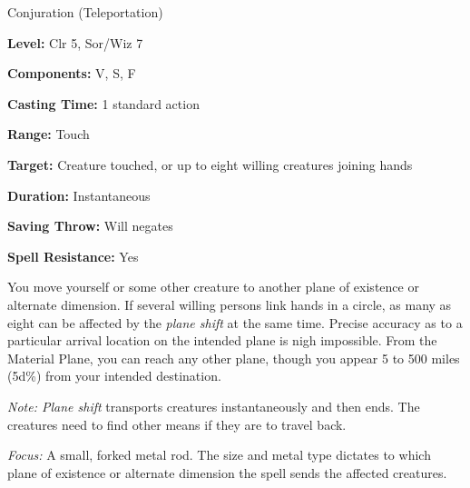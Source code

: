 
Conjuration (Teleportation)

\textbf{Level:} Clr 5, Sor/Wiz 7

\textbf{Components:} V, S, F

\textbf{Casting Time:} 1 standard action

\textbf{Range:} Touch

\textbf{Target:} Creature touched, or up to eight willing creatures joining hands

\textbf{Duration:} Instantaneous

\textbf{Saving Throw:} Will negates

\textbf{Spell Resistance:} Yes

You move yourself or some other creature to another plane of existence or alternate 
dimension. If several willing persons link hands in a circle, as many as eight 
can be affected by the \textit{plane shift} at the same time. Precise accuracy 
as to a particular arrival location on the intended plane is nigh impossible. From 
the Material Plane, you can reach any other plane, though you appear 5 to 500 miles 
(5d\%) from your intended destination.

\textit{Note: Plane shift} transports creatures instantaneously and then ends. 
The creatures need to find other means if they are to travel back.

\textit{Focus:} A small, forked metal rod. The size and metal type dictates to 
which plane of existence or alternate dimension the spell sends the affected creatures. 

